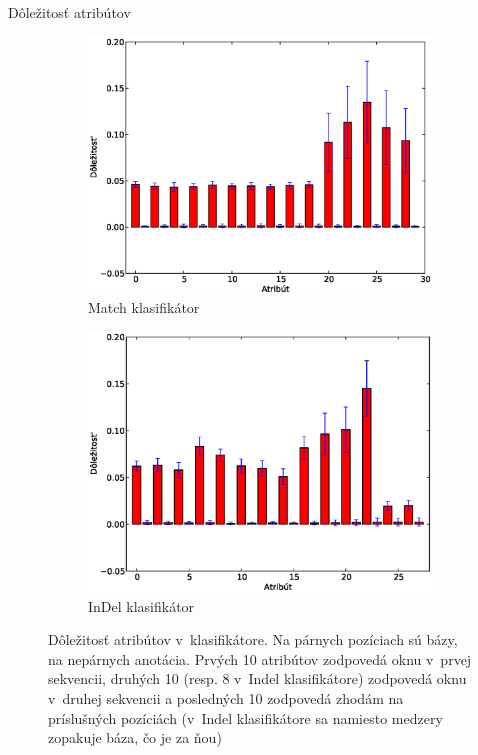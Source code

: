 \documentclass[xcolor=dvipsnames, compress, 12pt]{beamer}
\theoremstyle{definition}
\begin{document}
\begin{frame}{Dôležitosť atribútov}
\begin{figure}[h]
        \centering
        \begin{subfigure}[b]{0.35\textwidth}
                \includegraphics[width=\textwidth]{images/randomforest_combined_5_bars}
                \caption{Match klasifikátor}
        \end{subfigure}%
        \qquad\qquad %
        \begin{subfigure}[b]{0.35\textwidth}
                \includegraphics[width=\textwidth]{images/randomforest_combined_5_indel_bars}
                \caption{InDel klasifikátor}
        \end{subfigure}
        \caption{Dôležitosť atribútov v~klasifikátore. Na párnych pozíciach sú bázy, na nepárnych anotácia. Prvých 10 atribútov zodpovedá oknu v~prvej sekvencii, druhých 10 (resp. 8 v~Indel klasifikátore) zodpovedá oknu v~druhej sekvencii a posledných 10 zodpovedá zhodám na príslušných pozíciách (v~Indel klasifikátore sa namiesto medzery zopakuje báza, čo je za ňou)}
\end{figure}
\end{frame}
\end{document}
